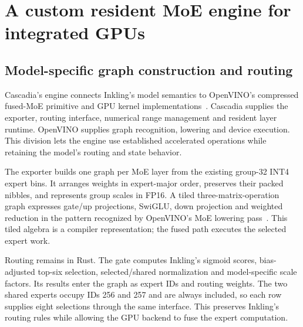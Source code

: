 \documentclass[11pt]{article}
\begin{document}
\section{A custom resident MoE engine for integrated GPUs}
\label{sec:resident}

\subsection{Model-specific graph construction and routing}
Cascadia's engine connects Inkling's model semantics to OpenVINO's compressed fused-MoE primitive and GPU kernel implementations~\cite{ovmoe}. Cascadia supplies the exporter, routing interface, numerical range management and resident layer runtime. OpenVINO supplies graph recognition, lowering and device execution. This division lets the engine use established accelerated operations while retaining the model's routing and state behavior.

The exporter builds one graph per MoE layer from the existing group-32 INT4 expert bins. It arranges weights in expert-major order, preserves their packed nibbles, and represents group scales in FP16. A tiled three-matrix-operation graph expresses gate/up projections, SwiGLU, down projection and weighted reduction in the pattern recognized by OpenVINO's MoE lowering pass~\cite{ovmoelowering}. This tiled algebra is a compiler representation; the fused path executes the selected expert work.

Routing remains in Rust. The gate computes Inkling's sigmoid scores, bias-adjusted top-six selection, selected/shared normalization and model-specific scale factors. Its results enter the graph as expert IDs and routing weights. The two shared experts occupy IDs 256 and 257 and are always included, so each row supplies eight selections through the same interface. This preserves Inkling's routing rules while allowing the GPU backend to fuse the expert computation.
\end{document}
